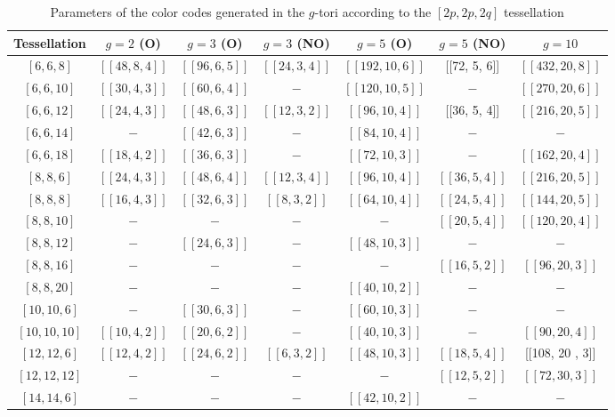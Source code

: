 \documentclass[%
reprint,
amsmath,amssymb,
aps,
]{revtex4-2}
\begin{document}
\begin{table}
	\caption{\label{tab13}
		Parameters of the color codes generated in the $g$-tori according to the $[2p,2p,2q]$ tessellation}
	\begin{ruledtabular}
				\begin{tabular}{|c|c|c|c|c|c|c|}
			Tessellation&$g=2$ (O) &$g=3$ (O) &$g=3$ (NO)&$g=5$ (O) & $g = 5$ (NO) & $g=10$\\ \hline
			$[6,6,8]$&$[[48,8,4]]$&$[[96,6,5]]$&$[[24,3,4]]$&$[[192,10,6]]$ & [[72, 5, 6]] & $[[432, 20, 8]]$ \\ \hline
			$[6,6,10]$ & $[[30, 4 , 3]]$ & $[[60,6,4]]$ & $-$ & $[[120, 10, 5]]$ & $-$ & $[[270, 20, 6]]$ \\ \hline
			$[6,6,12]$ & $[[24, 4, 3]]$ & $[[48, 6, 3]]$ & $[[12, 3, 2]]$ &  $[[96, 10, 4]]$ & [[36, 5, 4]] & $[[216, 20, 5]]$ \\ \hline
			$[6,6,14]$ &$-$& $[[42, 6, 3]]$ & $-$ & $[[84, 10, 4]]$ & $-$ & $-$ \\ \hline
			$[6,6,18]$ & $[[18, 4, 2]]$ & $[[36, 6, 3]]$ & $-$ & $[[72, 10, 3]]$ & $-$  & $[[162, 20, 4]]$ \\ \hline
			$[8,8,6]$ & $[[24, 4, 3]]$ & $[[48, 6, 4]]$ & $[[12, 3, 4]]$ & $[[96, 10, 4]]$ & $[[36, 5, 4]]$ & $[[216, 20, 5]]$ \\ \hline
			$[8,8,8]$ & $[[16, 4, 3]]$ & $[[32, 6, 3]]$ & $[[8, 3, 2]]$ & $[[64, 10, 4]]$ & $[[24, 5, 4]]$ & $[[144, 20, 5]]$ \\ \hline
			$[8,8,10]$ & $-$ & $-$& $-$ &$-$ &$[[20, 5, 4]]$ & $[[120, 20, 4]]$ \\ \hline
			$[8,8,12]$ & $-$& $[[24, 6, 3]]$ & $-$& $[[48, 10, 3]]$ & $-$ & $-$ \\ \hline
			$[8,8,16]$ & $-$ & $-$ & $-$ & $-$ & $[[16, 5, 2]]$ & $[[96, 20, 3]]$  \\ \hline
			$[8,8,20]$ & $-$ & $-$ & $-$& $[[40, 10, 2]]$ & $-$ & $ - $ \\ \hline
			$[10,10,6]$& $-$ & $[[30, 6, 3]]$ & $-$ & $[[60, 10, 3]]$ & $-$ & $-$ \\ \hline
			$[10,10,10]$ & $[[10,4,2]]$ & $[[20, 6, 2]]$ & $-$ & $[[40, 10, 3]]$ & $-$ & $[[90, 20, 4]]$ \\ \hline
			$[12,12,6]$ & $[[12, 4, 2]]$ & $[[24, 6, 2]]$ & $[[6, 3, 2]]$ & $[[48, 10, 3]]$ & $[[18, 5, 4]]$ & [[108, 20 , 3]] \\ \hline
			$[12,12,12]$ & $-$ &$-$& $-$ & $-$&$ [[12, 5, 2]]$ & $[[72, 30, 3]]$ \\ \hline
			$[14,14,6]$ & $-$ & $-$ & $-$ & $[[42, 10, 2]]$ & $-$ & $-$ \\ \hline

\end{tabular}
\end{ruledtabular}
\end{table}
\end{document}
